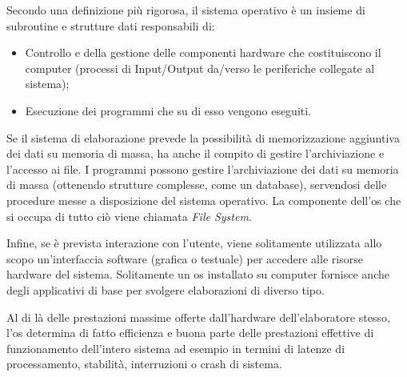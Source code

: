 Secondo  una definizione più rigorosa, il sistema operativo è un insieme di subroutine e strutture dati responsabili di:
\begin{itemize}
	\item
Controllo e della gestione delle componenti hardware che costituiscono il computer (processi di Input/Output da/verso le periferiche collegate al sistema);
	\item
Esecuzione dei programmi che su di esso vengono eseguiti.
\end{itemize}
Se il sistema di elaborazione prevede la possibilità di memorizzazione aggiuntiva dei dati su memoria di massa, ha anche il compito di gestire l'archiviazione e l'accesso ai file. I programmi possono gestire l'archiviazione dei dati su memoria di massa (ottenendo strutture complesse, come un database), servendosi delle procedure messe a disposizione del sistema operativo. La componente dell'\ac{os} che si occupa di tutto ciò viene chiamata \emph{File System}.

Infine, se è prevista interazione con l'utente, viene solitamente utilizzata allo scopo un'interfaccia software (grafica o testuale) per accedere alle risorse hardware del sistema. Solitamente un \ac{os} installato su computer fornisce anche degli applicativi di base per svolgere elaborazioni di diverso tipo.

Al di là delle prestazioni massime offerte dall'hardware dell'elaboratore stesso, l'\ac{os} determina di fatto efficienza e buona parte delle prestazioni effettive di funzionamento dell'intero sistema ad esempio in termini di latenze di processamento, stabilità, interruzioni o crash di sistema.

